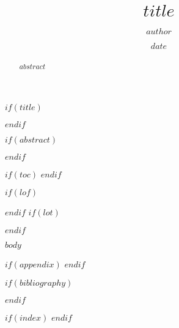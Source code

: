 \documentclass[$if(fontsize)$fontsize=$fontsize$,$endif$$if(papersize)$papersize=$papersize$,$endif$$if(classoption)$$classoption$,$endif$]{$documentclass$}
\title{$title$}
\author{$author$}
\date{$date$}
\date{} %
\newcommand\$variable$$value$
\begin{document}
$if(title)$
\maketitle
\thispagestyle{empty}
$endif$

$if(abstract)$
\begin{abstract}
$abstract$
\end{abstract}
\thispagestyle{empty}
$endif$

$if(toc)$
\clearpage
\tableofcontents
\thispagestyle{tocwithfooter}
\clearpage
\pagestyle{plain}
$endif$

$if(lof)$
\listoffigures
\thispagestyle{plain}
$endif$
$if(lot)$
\listoftables
\thispagestyle{plain}
$endif$

\setcounter{page}{1}

$body$

$if(appendix)$
\appendix
$endif$

$if(bibliography)$

$endif$

$if(index)$
\printindex
$endif$

\end{document}
